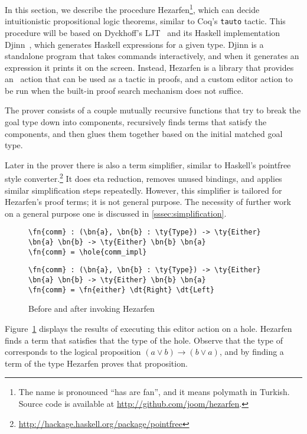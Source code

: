 In this section, we describe the procedure Hezarfen\footnote{The name is
  pronounced ``has are fan'', and it means
    polymath in Turkish. Source code is available at
    \url{http://github.com/joom/hezarfen}.}, which can decide intuitionistic
propositional logic theorems, similar to Coq's \texttt{tauto} tactic.
This procedure will be based on Dyckhoff's LJT~\cite{ljt} and its Haskell
implementation Djinn~\cite{djinn}, which generates Haskell expressions
for a given type.
Djinn is a standalone program that takes commands
interactively, and when it generates an expression it prints it on the screen.
Instead, Hezarfen is a library that provides an \Elab\ action
that can be used as a tactic in proofs, and a custom editor action to be run
when the built-in proof search mechanism does not suffice.

The prover consists of a couple mutually recursive functions that try to break
the goal type down into components, recursively finds terms that satisfy the
components, and then glues them together based on the initial matched goal
type.

Later in the prover there is also a term simplifier, similar to Haskell's
pointfree style
converter.\footnote{\url{http://hackage.haskell.org/package/pointfree}} It does
eta reduction, removes unused  bindings, and applies similar
simplification steps repeatedly.
However, this simplifier is tailored for Hezarfen's proof terms; it is not
general purpose.  The necessity of further work on a general purpose one is
discussed in \autoref{sssec:simplification}.

\begin{figure}[h]
\begin{Verbatim}
\fn{comm} : (\bn{a}, \bn{b} : \ty{Type}) -> \ty{Either} \bn{a} \bn{b} -> \ty{Either} \bn{b} \bn{a}
\fn{comm} = \hole{comm_impl}
\end{Verbatim}
  \vspace{1em}
\begin{Verbatim}
\fn{comm} : (\bn{a}, \bn{b} : \ty{Type}) -> \ty{Either} \bn{a} \bn{b} -> \ty{Either} \bn{b} \bn{a}
\fn{comm} = \fn{either} \dt{Right} \dt{Left}
\end{Verbatim}
\caption{Before and after invoking Hezarfen}
  \label{fig:hezarfen-example}
\end{figure}

Figure~\ref{fig:hezarfen-example} displays the results of
executing this editor action on a hole.
Hezarfen finds a term that satisfies that the type of the hole.
Observe that the type of  corresponds to the logical proposition
$(a \lor b) \to (b \lor a)$, and by finding a term of the type Hezarfen proves
that proposition.
